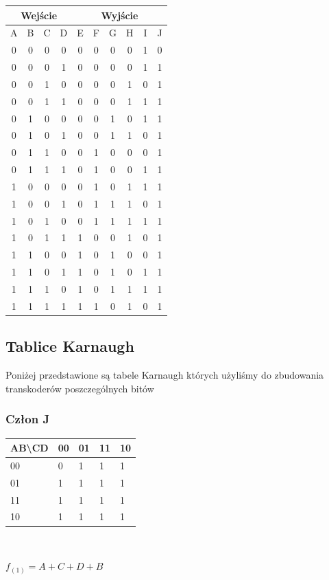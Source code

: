 \documentclass[a4paper]{article}
\begin{document}
\begin{center}
  \begin{tabular}{|c|c|c|c||c|c|c|c|c|c|}
  \hline \multicolumn{4}{|c||}{Wejście} & \multicolumn{6}{|c|}{Wyjście} \\
  \hline A & B & C & D & E & F & G & H & I & J \\
  \hline 0 & 0 & 0 & 0 & 0 & 0 & 0 & 0 & 1 & 0 \\
  \hline 0 & 0 & 0 & 1 & 0 & 0 & 0 & 0 & 1 & 1 \\
  \hline 0 & 0 & 1 & 0 & 0 & 0 & 0 & 1 & 0 & 1 \\
  \hline 0 & 0 & 1 & 1 & 0 & 0 & 0 & 1 & 1 & 1 \\
  \hline 0 & 1 & 0 & 0 & 0 & 0 & 1 & 0 & 1 & 1 \\
  \hline 0 & 1 & 0 & 1 & 0 & 0 & 1 & 1 & 0 & 1 \\
  \hline 0 & 1 & 1 & 0 & 0 & 1 & 0 & 0 & 0 & 1 \\
  \hline 0 & 1 & 1 & 1 & 0 & 1 & 0 & 0 & 1 & 1 \\
  \hline 1 & 0 & 0 & 0 & 0 & 1 & 0 & 1 & 1 & 1 \\
  \hline 1 & 0 & 0 & 1 & 0 & 1 & 1 & 1 & 0 & 1 \\
  \hline 1 & 0 & 1 & 0 & 0 & 1 & 1 & 1 & 1 & 1 \\
  \hline 1 & 0 & 1 & 1 & 1 & 0 & 0 & 1 & 0 & 1 \\
  \hline 1 & 1 & 0 & 0 & 1 & 0 & 1 & 0 & 0 & 1 \\
  \hline 1 & 1 & 0 & 1 & 1 & 0 & 1 & 0 & 1 & 1 \\
  \hline 1 & 1 & 1 & 0 & 1 & 0 & 1 & 1 & 1 & 1 \\
  \hline 1 & 1 & 1 & 1 & 1 & 1 & 0 & 1 & 0 & 1 \\

  \hline 
  \end{tabular}
\end{center}


\subsection{Tablice Karnaugh}
Poniżej przedstawione są tabele Karnaugh których użyliśmy do zbudowania transkoderów poszczególnych bitów
\subsubsection{Człon J}
\begin{center}
\begin{tabular}{|l|l|l|l|l|}
  \hline
  AB\textbackslash{}CD & 00 & 01 & 11 & 10 \\ \hline
  00                   & 0  & 1  & 1  & 1  \\ \hline
  01                   & 1  & 1  & 1  & 1  \\ \hline
  11                   & 1  & 1  & 1  & 1  \\ \hline
  10                   & 1  & 1  & 1  & 1  \\ \hline
  \end{tabular}  \\
\end{center}
\begin{center}
  $f_{(1)} =A+C+D+B $
\end{center}
\end{document}
